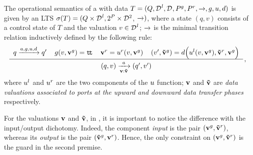 \begin{definition}
  \label{defn:data:semantics}
  The operational semantics of a \compmodel{} with data $T = (Q,
  \local{\data}, \data, \pin, \pout, \goesto{}, \guard, \up, \down)$ is
  given by an LTS $\undata{T} = (Q \times \local{\data}, 2^P \times
  \data[2]$, \mbox{$\goesto{})$}, where a state $(q, v)$ consists of a
  control state of $T$ and the valuation $v \in \local{\data}$;
  $\goesto{}$ is the minimal transition relation inductively defined by the
  following rule:
  \begin{equation}
    \label{eq:data:semantics}
    \renewcommand{\arraystretch}{1.5}
    \derrule[4]{
      q \goesto{a,\guard,\up,\down} q'
      &
      \guard(v, \grant{\portdata{v}}) = \true
      &
      \request{\portdata{v}} = 
      \request{\up}(v, \grant{\portdata{v}})
      &
      (v', \grant{\portdata{\tilde{v}}}) =
      \down\Big(
      \local{\up}(v, \grant{\portdata{v}}),
      \request{\portdata{\tilde{v}}}, 
      \grant{\portdata{v}}
      \Big)
    }{
      (q, v)
      \goesto[\portdata{v}:\portdata{\tilde{v}}]{a}
      (q', v')
    }\,,
  \end{equation}
  where $\local{\up}$ and $\request{\up}$ are the two components of the
  $\up$ function; $\portdata{v}$ and $\portdata{\tilde{v}}$ are \emph{data
  valuations associated to ports at the upward and downward data transfer
  phases} respectively.
\end{definition}

For the valuations $\portdata{v}$ and $\portdata{\tilde{v}}$, in
, it is important to notice the difference with the
input/output dichotomy.  Indeed, the component \emph{input} is the pair
$(\grant{\portdata{v}}, \request{\portdata{\tilde{v}}})$, whereas its
\emph{output} is the pair $(\grant{\portdata{\tilde{v}}},
\request{\portdata{v}})$.  Hence, the only constraint on
$(\grant{\portdata{v}}, \request{\portdata{\tilde{v}}})$ is the guard in
the second premise.


